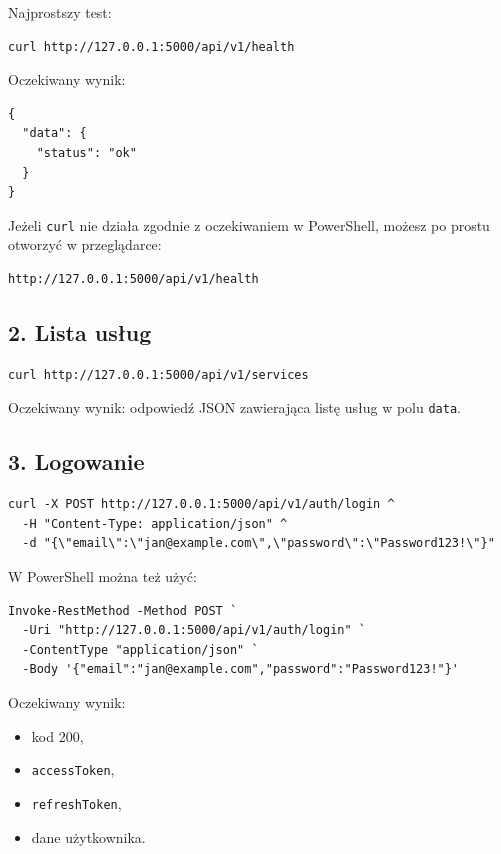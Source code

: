 \documentclass[11pt,a4paper]{article}
\begin{document}
Najprostszy test:

\begin{lstlisting}
curl http://127.0.0.1:5000/api/v1/health
\end{lstlisting}

Oczekiwany wynik:

\begin{lstlisting}
{
  "data": {
    "status": "ok"
  }
}
\end{lstlisting}

Jeżeli \texttt{curl} nie działa zgodnie z oczekiwaniem w PowerShell, możesz po prostu otworzyć w przeglądarce:

\begin{lstlisting}
http://127.0.0.1:5000/api/v1/health
\end{lstlisting}

\subsection{2. Lista usług}

\begin{lstlisting}
curl http://127.0.0.1:5000/api/v1/services
\end{lstlisting}

Oczekiwany wynik: odpowiedź JSON zawierająca listę usług w polu \texttt{data}.

\subsection{3. Logowanie}

\begin{lstlisting}
curl -X POST http://127.0.0.1:5000/api/v1/auth/login ^
  -H "Content-Type: application/json" ^
  -d "{\"email\":\"jan@example.com\",\"password\":\"Password123!\"}"
\end{lstlisting}

W PowerShell można też użyć:

\begin{lstlisting}
Invoke-RestMethod -Method POST `
  -Uri "http://127.0.0.1:5000/api/v1/auth/login" `
  -ContentType "application/json" `
  -Body '{"email":"jan@example.com","password":"Password123!"}'
\end{lstlisting}

Oczekiwany wynik:
\begin{itemize}[leftmargin=1.2cm]
    \item kod 200,
    \item \texttt{accessToken},
    \item \texttt{refreshToken},
    \item dane użytkownika.
\end{itemize}
\end{document}
